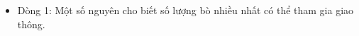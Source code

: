 \begin{itemize}
	\item     Dòng 1: Một số nguyên cho biết số lượng bò nhiều nhất có thể            tham gia giao thông.   
\end{itemize}